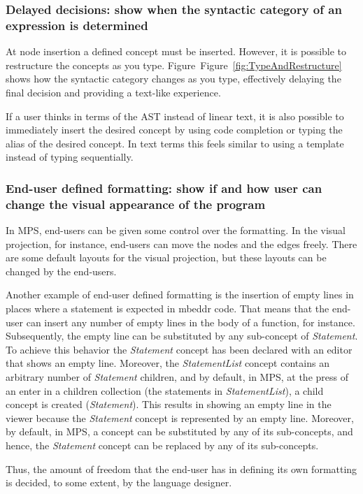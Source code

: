 \documentclass[preprint,numbers,10pt]{sigplanconf}
\begin{document}
\subsubsection{Delayed decisions: show when the syntactic category of an expression is determined}
At node insertion a defined concept must be inserted. However, it is possible to restructure the concepts as you type. Figure~Figure~\ref{fig:TypeAndRestructure} shows how the syntactic category changes as you type, effectively delaying the final decision and providing a text-like experience.

If a user thinks in terms of the AST instead of linear text, it is also possible to immediately insert the desired concept by using code completion or typing the alias of the desired concept. In text terms this feels similar to using a template instead of typing sequentially.

\subsubsection{End-user defined formatting: show if and how user can change the visual appearance of the program}
In MPS, end-users can be given some control over the formatting. In the visual projection, for instance,
end-users can move the nodes and the edges freely. There are some default layouts for the visual projection, but these
layouts can be changed by the end-users.

Another example of end-user defined formatting is the insertion of
empty lines in places where a statement is expected in mbeddr code. That means that the end-user can insert any number
of empty lines in the body of a function, for instance. Subsequently, the empty line can be substituted by any sub-concept of \emph{Statement}.
To achieve this behavior the \emph{Statement} concept has been declared with an editor that shows an empty line.
Moreover, the \emph{StatementList} concept contains an arbitrary number of \emph{Statement} children, and by default,
in MPS, at the press of an enter in a children collection (the statements in \emph{StatementList}), a child concept is created (\emph{Statement}).
This results in showing an empty line in the viewer because the \emph{Statement} concept is represented by an empty line.
Moreover, by default, in MPS, a concept can be substituted by any of its sub-concepts, and hence,
the \emph{Statement} concept can be replaced by any of its sub-concepts.

Thus, the amount of freedom that the end-user has in defining its own formatting
is decided, to some extent, by the language designer.
\end{document}
